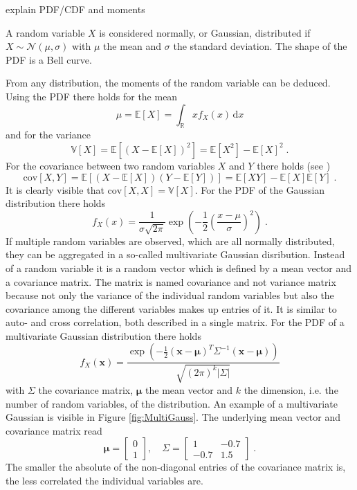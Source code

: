 \documentclass[%
  a4paper,oneside,%
  11pt,%
  smallchapters,
  style=printdev,
  extramargin,
  green,%
  rgb, <cmyk>
  ]{tubsbook}
\begin{document}
explain PDF/CDF and moments

A random variable $X$ is considered normally, or Gaussian, distributed if $X \sim \mathcal{N}(\mu, \sigma)$ with $\mu$ the mean and $\sigma$ the standard deviation. The shape of the PDF is a Bell curve.

From any distribution, the moments of the random variable can be deduced. Using the PDF there holds for the mean
\begin{equation}
\mu = \mathbb{E}[X] = \int_{\mathbb{R}} x f_X(x) \, \mathrm{d}x
\end{equation}
%
and for the variance
\begin{equation}
\mathbb{V}[X] = \mathbb{E}[(X-\mathbb{E}[X])^2] = \mathbb{E}[X^2] - \mathbb{E}[X]^2 \;.
\end{equation}
%
For the covariance between two random variables $X$ and $Y$ there holds (see \cite[p. 1434]{arens2015})
\begin{equation}
\mathrm{cov}[X,Y] = \mathbb{E}[(X-\mathbb{E}[X])(Y-\mathbb{E}[Y])] = \mathbb{E}[XY] - \mathbb{E}[X] \mathbb{E}[Y]\;.
\label{eqn:Covariance}
\end{equation}
It is clearly visible that $\mathrm{cov}[X,X] = \mathbb{V}[X]$.
%
For the PDF of the Gaussian distribution there holds
\begin{equation}
f_X(x) = \frac{1}{\sigma \sqrt{2 \pi}} \exp(-\frac{1}{2} \left(\frac{x-\mu}{\sigma}\right)^2) \;.
\end{equation}
%
If multiple random variables are observed, which are all normally distributed, they can be aggregated in a so-called multivariate Gaussian disribution. Instead of a random variable it is a random vector which is defined by a mean vector and a covariance matrix. The matrix is named covariance and not variance matrix because not only the variance of the individual random variables but also the covariance among the different variables makes up entries of it. It is similar to auto- and cross correlation, both described in a single matrix.
For the PDF of a multivariate Gaussian distribution there holds
\begin{equation}
f_X(\bm{x}) = \frac{\exp(-\frac{1}{2}(\bm{x}-\bm{\mu})^T \Sigma^{-1}(\bm{x}-\bm{\mu}))}{\sqrt{(2\pi)^k \lvert \Sigma \rvert}}
\label{eqn:MultivariateGaussian}
\end{equation}
with $\Sigma$ the covariance matrix, $\bm{\mu}$ the mean vector and $k$ the dimension, i.e. the number of random variables, of the distribution.
An example of a multivariate Gaussian is visible in Figure \ref{fig:MultiGauss}. The underlying mean vector and covariance matrix read
\begin{equation}
\bm{\mu} = \begin{bmatrix}
           0 \\
           1
         \end{bmatrix}
, \quad     
\Sigma = \begin{bmatrix}
1 & -0.7 \\
-0.7 & 1.5 
\end{bmatrix} \;.
\end{equation}
The smaller the absolute of the non-diagonal entries of the covariance matrix is, the less correlated the individual variables are.
\end{document}
